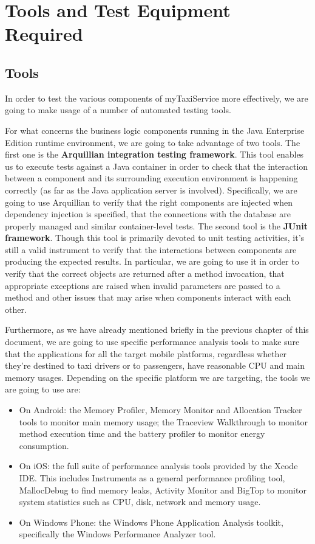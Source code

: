 \chapter{Tools and Test Equipment Required}
\section{Tools}
In order to test the various components of myTaxiService more effectively, we are going to make usage of a number of automated testing tools. 

For what concerns the business logic components running in the Java Enterprise Edition runtime environment, we are going to take advantage of two tools.
The first one is the \textbf{Arquillian integration testing framework}. This tool enables us to execute tests against a Java container in order to check that the interaction between a component and its surrounding execution environment is happening correctly (as far as the Java application server is involved). Specifically, we are going to use Arquillian to verify that the right components are injected when dependency injection is specified, that the connections with the database are properly managed and similar container-level tests.
The second tool is the \textbf{JUnit framework}. Though this tool is primarily devoted to unit testing activities, it's still a valid instrument to verify that the interactions between components are producing the expected results. In particular, we are going to use it in order to verify that the correct objects are returned after a method invocation, that appropriate exceptions are raised when invalid parameters are passed to a method and other issues that may arise when components interact with each other.

Furthermore, as we have already mentioned briefly in the previous chapter of this document, we are going to use specific performance analysis tools to make sure that the applications for all the target mobile platforms, regardless whether they're destined to taxi drivers or to passengers, have reasonable CPU and main memory usages. Depending on the specific platform we are targeting, the tools we are going to use are:
\begin{itemize}
	\item On Android: the Memory Profiler, Memory Monitor and Allocation Tracker tools to monitor main memory usage; the Traceview Walkthrough to monitor method execution time and the battery profiler to monitor energy consumption.
	\item On iOS: the full suite of performance analysis tools provided by the Xcode IDE. This includes Instruments as a general performance profiling tool, MallocDebug to find memory leaks, Activity Monitor and BigTop to monitor system statistics such as CPU, disk, network and memory usage. 
	\item On Windows Phone: the Windows Phone Application Analysis toolkit, specifically the Windows Performance Analyzer tool.
\end{itemize}

